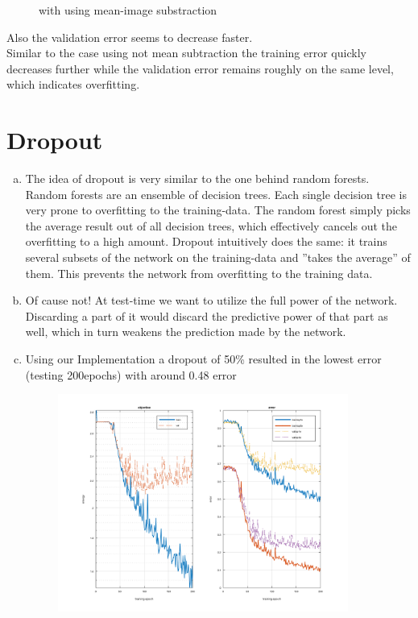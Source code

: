 \documentclass[12pt]{article}
\begin{document}
\begin{enumerate}[a)]
\begin{figure}[H]
                \caption{with using mean-image substraction}
        \end{figure}
        Also the validation error seems to decrease faster.\\
        Similar to the case using not mean subtraction the training error quickly decreases further while the validation error remains roughly on the same level, which indicates overfitting.
\end{enumerate}


\newpage
\section{Dropout}

\begin{enumerate}[a)]
    \item 
        The idea of dropout is very similar to the one behind random forests. Random forests are an ensemble of decision trees. Each single decision tree is very prone to overfitting to the training-data. The random forest simply picks the average result out of all decision trees, which effectively cancels out the overfitting to a high amount. Dropout intuitively does the same: it trains several subsets of the network on the training-data and ''takes the average'' of them. This prevents the network from overfitting to the training data.
    \item
        Of cause not! At test-time we want to utilize the full power of the network. Discarding a part of it would discard the predictive power of that part as well, which in turn weakens the prediction made by the network.
    \item
        Using our Implementation a dropout of 50\% resulted in the lowest error (testing 200epochs) with around 0.48 error 
        \begin{figure}[H]
            \centering
                \includegraphics[width=0.9\textwidth]{Plots/3_50_200.png}

\end{figure}
\end{enumerate}
\end{document}
